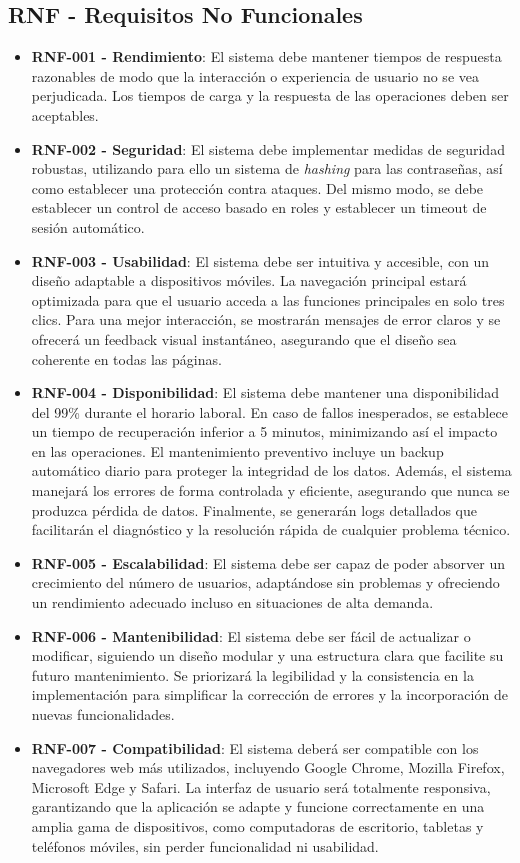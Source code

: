 \subsection{RNF - Requisitos No Funcionales}
\begin{itemize}
\tightlist
\item
\textbf{RNF-001 - Rendimiento}: El sistema debe mantener tiempos de respuesta razonables de modo que la interacción o experiencia de usuario no se vea perjudicada. Los tiempos de carga y la respuesta de las operaciones deben ser aceptables.
\item
\textbf{RNF-002 - Seguridad}: El sistema debe implementar medidas de seguridad robustas, utilizando para ello un sistema de \emph{hashing} para las contraseñas, así como establecer una protección contra ataques. Del mismo modo, se debe establecer un control de acceso basado en roles y establecer un timeout de sesión automático.
\item
\textbf{RNF-003 - Usabilidad}: El sistema debe ser intuitiva y accesible, con un diseño adaptable a dispositivos móviles. La navegación principal estará optimizada para que el usuario acceda a las funciones principales en solo tres clics. Para una mejor interacción, se mostrarán mensajes de error claros y se ofrecerá un feedback visual instantáneo, asegurando que el diseño sea coherente en todas las páginas.

\item
\textbf{RNF-004 - Disponibilidad}: El sistema debe mantener una disponibilidad del 99\% durante el horario laboral. En caso de fallos inesperados, se establece un tiempo de recuperación inferior a 5 minutos, minimizando así el impacto en las operaciones. El mantenimiento preventivo incluye un backup automático diario para proteger la integridad de los datos. Además, el sistema manejará los errores de forma controlada y eficiente, asegurando que nunca se produzca pérdida de datos. Finalmente, se generarán logs detallados que facilitarán el diagnóstico y la resolución rápida de cualquier problema técnico.
\item
\textbf{RNF-005 - Escalabilidad}: El sistema debe ser capaz de poder absorver un crecimiento del número de usuarios, adaptándose sin problemas y ofreciendo un rendimiento adecuado incluso en situaciones de alta demanda.
\item
\textbf{RNF-006 - Mantenibilidad}: El sistema debe ser fácil de actualizar o modificar, siguiendo un diseño modular y una estructura clara que facilite su futuro mantenimiento. Se priorizará la legibilidad y la consistencia en la implementación para simplificar la corrección de errores y la incorporación de nuevas funcionalidades.
\item
\textbf{RNF-007 - Compatibilidad}: El sistema deberá ser compatible con los navegadores web más utilizados, incluyendo Google Chrome, Mozilla Firefox, Microsoft Edge y Safari. La interfaz de usuario será totalmente responsiva, garantizando que la aplicación se adapte y funcione correctamente en una amplia gama de dispositivos, como computadoras de escritorio, tabletas y teléfonos móviles, sin perder funcionalidad ni usabilidad.
\end{itemize}

